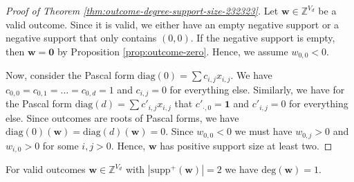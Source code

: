 \begin{proof}[Proof of Theorem \ref{thm:outcome-degree-support-size-232323}]
    Let \( \mathbf{w} \in \mathbb{Z}^{V_d} \) be a valid outcome. Since it is valid, we either have an empty negative support or a negative support that only contains \( (0,0) \). If the negative support is empty, then \( \mathbf{w} = \mathbf 0 \) by Proposition \ref{prop:outcome-zero}. Hence, we assume \( w_{0,0} < 0 \).

    Now, consider the Pascal form \( \mathrm{diag}(0) = \sum c_{i,j} x_{i,j} \). We have \( c_{0, 0} = c_{0, 1} = \dots = c_{0, d} = 1 \) and \( c_{i,j} = 0 \) for everything else. Similarly, we have for the Pascal form \( \mathrm{diag}(d) = \sum c'_{i,j} x_{i,j} \) that \( c'_{\cdot, 0} = \mathbf 1 \) and \( c'_{i,j} = 0 \) for everything else. Since outcomes are roots of Pascal forms, we have \( \mathrm{diag}(0)(\mathbf w) = \mathrm{diag}(d)(\mathbf w) = 0 \).
    Since \( w_{0,0} < 0 \) we must have \( w_{0,j} > 0 \) and \( w_{i, 0} > 0 \) for some \( i,j > 0 \). Hence, \( \mathbf{w} \) has positive support size at least two.
\end{proof}

\begin{theorem}\label{thm:outcome-degree-support-size-232323343}
    For valid outcomes \( \mathbf w \in \mathbb{Z}^{V_d} \) with \( |\mathrm{supp}^+(\mathbf w)| = 2 \) we have \( \mathrm{deg}(\mathbf w) = 1 \).
\end{theorem}


